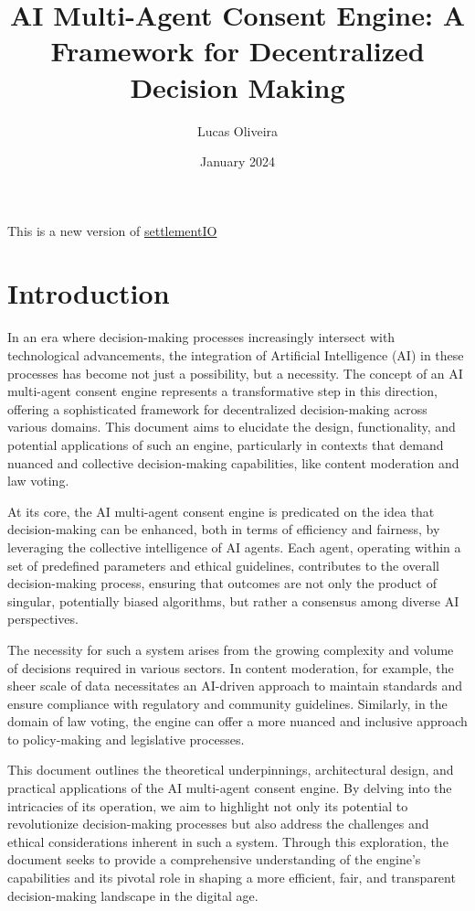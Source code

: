 \documentclass{article}
\title{AI Multi-Agent Consent Engine: A Framework for
Decentralized Decision
Making}
\author{Lucas Oliveira}
\date{January 2024}
\begin{document}
\maketitle


This is a new version of \href{https://github.com/jucasoliveira/settlementIO}{settlementIO}

\hypertarget{introduction}{%
\section*{Introduction}\label{introduction}}

In an era where decision-making processes increasingly intersect with
technological advancements, the integration of Artificial Intelligence
(AI) in these processes has become not just a possibility, but a
necessity. The concept of an AI multi-agent consent engine represents a
transformative step in this direction, offering a sophisticated
framework for decentralized decision-making across various domains. This
document aims to elucidate the design, functionality, and potential
applications of such an engine, particularly in contexts that demand
nuanced and collective decision-making capabilities, like content
moderation and law voting.

At its core, the AI multi-agent consent engine is predicated on the idea
that decision-making can be enhanced, both in terms of efficiency and
fairness, by leveraging the collective intelligence of AI agents. Each
agent, operating within a set of predefined parameters and ethical
guidelines, contributes to the overall decision-making process, ensuring
that outcomes are not only the product of singular, potentially biased
algorithms, but rather a consensus among diverse AI perspectives.

The necessity for such a system arises from the growing complexity and
volume of decisions required in various sectors. In content moderation,
for example, the sheer scale of data necessitates an AI-driven approach
to maintain standards and ensure compliance with regulatory and
community guidelines. Similarly, in the domain of law voting, the engine
can offer a more nuanced and inclusive approach to policy-making and
legislative processes.

This document outlines the theoretical underpinnings, architectural
design, and practical applications of the AI multi-agent consent engine.
By delving into the intricacies of its operation, we aim to highlight
not only its potential to revolutionize decision-making processes but
also address the challenges and ethical considerations inherent in such
a system. Through this exploration, the document seeks to provide a
comprehensive understanding of the engine's capabilities and its pivotal
role in shaping a more efficient, fair, and transparent decision-making
landscape in the digital age.
\end{document}
